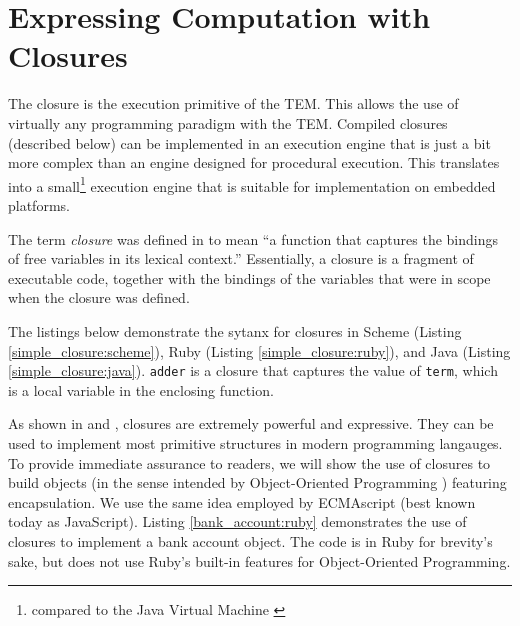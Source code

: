 \section{Expressing Computation with Closures}\label{concepts:closures}
The closure is the execution primitive of the TEM. This allows the use
of virtually any programming paradigm with the TEM. Compiled closures (described
below) can be implemented in an execution engine that is just a bit more
complex than an engine designed for procedural execution. This translates into
a small\footnote{compared to the Java Virtual Machine \cite{lindholm1999jvm}}
execution engine that is suitable for implementation on embedded platforms.

The term \emph{closure} was defined in \cite{Suss:75} to mean
``a function that captures the bindings of free variables
in its lexical context.'' Essentially, a closure is a fragment of executable
code, together with the bindings of the variables that were in scope when the
closure was defined.

The listings below demonstrate the sytanx for closures in Scheme
(Listing \ref{simple_closure:scheme}), Ruby (Listing \ref{simple_closure:ruby}),
and Java (Listing \ref{simple_closure:java}). \texttt{adder} is a closure that
captures the value of \texttt{term}, which is a local variable in the enclosing function.








As shown in \cite{ste1976lambda2} and \cite{ste1976lambda1}, closures are
extremely powerful and expressive. They can be used to implement most primitive structures in
modern programming langauges. To provide immediate assurance to readers,
we will show the use of closures to build objects (in the sense intended by
Object-Oriented Programming \cite{cox1986oop}) featuring encapsulation. We use
the same idea employed by ECMAscript \cite{ecma1999els} (best known today as
JavaScript). Listing \ref{bank_account:ruby} demonstrates the use of closures to
implement a bank account object. The code is in Ruby for brevity's sake, but
does not use Ruby's built-in features for Object-Oriented Programming.

